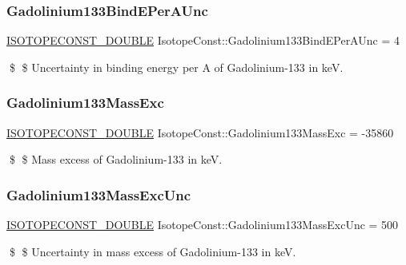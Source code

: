 \subsubsection{\texorpdfstring{Gadolinium133\+Bind\+E\+Per\+A\+Unc}{Gadolinium133BindEPerAUnc}}
{\footnotesize\ttfamily \mbox{\hyperlink{group___isotope_const-_macros_ga8f45a7272ce02c0b4c65c44636ed719a}{I\+S\+O\+T\+O\+P\+E\+C\+O\+N\+S\+T\+\_\+\+D\+O\+U\+B\+LE}} Isotope\+Const\+::\+Gadolinium133\+Bind\+E\+Per\+A\+Unc = 4}

\$ \$ Uncertainty in binding energy per A of Gadolinium-\/133 in keV. \mbox{\label{group___isotope_const-_gadolinium-_gd133_ga916bf4de0fdb63f0d9fe251538b1e0dd}} 
\subsubsection{\texorpdfstring{Gadolinium133\+Mass\+Exc}{Gadolinium133MassExc}}
{\footnotesize\ttfamily \mbox{\hyperlink{group___isotope_const-_macros_ga8f45a7272ce02c0b4c65c44636ed719a}{I\+S\+O\+T\+O\+P\+E\+C\+O\+N\+S\+T\+\_\+\+D\+O\+U\+B\+LE}} Isotope\+Const\+::\+Gadolinium133\+Mass\+Exc = -\/35860}

\$ \$ Mass excess of Gadolinium-\/133 in keV. \mbox{\label{group___isotope_const-_gadolinium-_gd133_ga46aa9305b4717d931f944f894cfa3d88}} 
\subsubsection{\texorpdfstring{Gadolinium133\+Mass\+Exc\+Unc}{Gadolinium133MassExcUnc}}
{\footnotesize\ttfamily \mbox{\hyperlink{group___isotope_const-_macros_ga8f45a7272ce02c0b4c65c44636ed719a}{I\+S\+O\+T\+O\+P\+E\+C\+O\+N\+S\+T\+\_\+\+D\+O\+U\+B\+LE}} Isotope\+Const\+::\+Gadolinium133\+Mass\+Exc\+Unc = 500}

\$ \$ Uncertainty in mass excess of Gadolinium-\/133 in keV. \mbox{\label{group___isotope_const-_gadolinium-_gd133_gab55239a94ccaeb24b76cbc52e851d90b}} 
